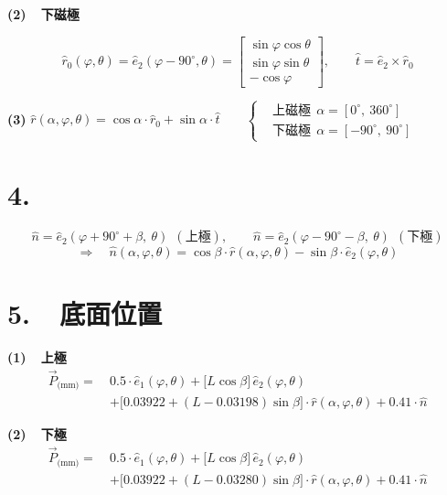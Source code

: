 \documentclass[11pt]{article}
\newcommand{\eo}{\hat{e}_1}
\newcommand{\et}{\hat{e}_2}
\newcommand{\rz}{\hat{r}_0}
\newcommand{\rh}{\hat{r}}
\newcommand{\tv}{\hat{t}}
\newcommand{\nh}{\hat{n}}
\begin{document}
\vspace{6pt}
\noindent\begin{minipage}{\textwidth}
\textbf{(2)\ \ 下磁極}

\begin{minipage}[c]{0.20\textwidth}
\centering
{}
\end{minipage}
\begin{minipage}[c]{0.78\textwidth}
\[
\rz(\varphi,\theta)=\et(\varphi-90^\circ,\theta)=
\begin{bmatrix}\sin\varphi\cos\theta\\[1pt] \sin\varphi\sin\theta\\[1pt] -\cos\varphi\end{bmatrix},
\qquad \tv=\et\times\rz
\]
\end{minipage}
\end{minipage}

\vspace{8pt}
\textbf{(3)}\quad
$\displaystyle \rh(\alpha,\varphi,\theta)=\cos\alpha\cdot\rz+\sin\alpha\cdot\tv
\qquad
\left\{\begin{aligned}
&\text{上磁極}\ \ \alpha=[0^\circ,\ 360^\circ]\\
&\text{下磁極}\ \ \alpha=[-90^\circ,\ 90^\circ]
\end{aligned}\right.$

\section*{4.}

\[
\nh=\et(\varphi+90^\circ+\beta,\ \theta)\ \ (\text{上極}),
\qquad
\nh=\et(\varphi-90^\circ-\beta,\ \theta)\ \ (\text{下極})
\]
\[
\Longrightarrow\quad
\nh(\alpha,\varphi,\theta)=\cos\beta\cdot\rh(\alpha,\varphi,\theta)-\sin\beta\cdot\et(\varphi,\theta)
\]

\section*{5.\ \ 底面位置}

\textbf{(1)\ \ 上極}
\begin{align*}
\vec{P}_{\text{(mm)}}=\ &0.5\cdot\eo(\varphi,\theta)
+\big[L\cos\beta\big]\,\et(\varphi,\theta)\\[2pt]
&+\big[0.03922+(L-0.03198)\sin\beta\big]\cdot\rh(\alpha,\varphi,\theta)
+0.41\cdot\nh
\end{align*}

\vspace{2pt}
\textbf{(2)\ \ 下極}
\begin{align*}
\vec{P}_{\text{(mm)}}=\ &0.5\cdot\eo(\varphi,\theta)
+\big[L\cos\beta\big]\,\et(\varphi,\theta)\\[2pt]
&+\big[0.03922+(L-0.03280)\sin\beta\big]\cdot\rh(\alpha,\varphi,\theta)
+0.41\cdot\nh
\end{align*}
\end{document}
